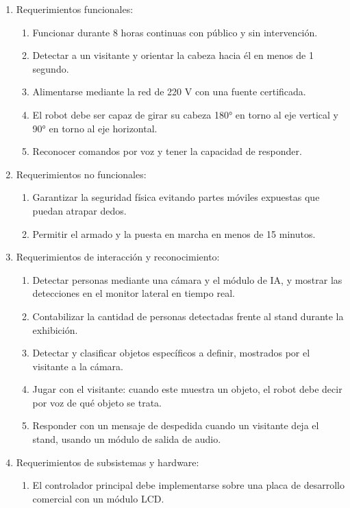 \documentclass[
11pt, %
]{charter}
\begin{document}
\begin{enumerate}
	\item Requerimientos funcionales:
		\begin{enumerate}
			\item Funcionar durante 8 horas continuas con público y sin intervención.
			\item Detectar a un visitante y orientar la cabeza hacia él en menos de 1 segundo.
			\item Alimentarse mediante la red de 220 V con una fuente certificada.
			\item El robot debe ser capaz de girar su cabeza 180° en torno al eje vertical y 90° en torno al eje horizontal.
			\item Reconocer comandos por voz y tener la capacidad de responder.
		\end{enumerate}
	\item Requerimientos no funcionales:
		\begin{enumerate}
			\item Garantizar la seguridad física evitando partes móviles expuestas que puedan atrapar dedos.
			\item  Permitir el armado y la puesta en marcha en menos de 15 minutos. 
		\end{enumerate}	
	\item Requerimientos de interacción y reconocimiento:
		\begin{enumerate}
			\item Detectar personas mediante una cámara y el módulo de IA, y mostrar las detecciones en el monitor lateral en tiempo real.
			\item Contabilizar la cantidad de personas detectadas frente al stand durante la exhibición.
			\item Detectar y clasificar objetos específicos a definir, mostrados por el visitante a la cámara.
			\item Jugar con el visitante: cuando este muestra un objeto, el robot debe decir por voz de qué objeto se trata.
			\item Responder con un mensaje de despedida cuando un visitante deja el stand, usando un módulo de salida de audio.
		\end{enumerate}
	\item Requerimientos de subsistemas y hardware:
		\begin{enumerate}
			\item El controlador principal debe implementarse sobre una placa de desarrollo comercial con un módulo LCD.

\end{enumerate}
\end{enumerate}
\end{document}
